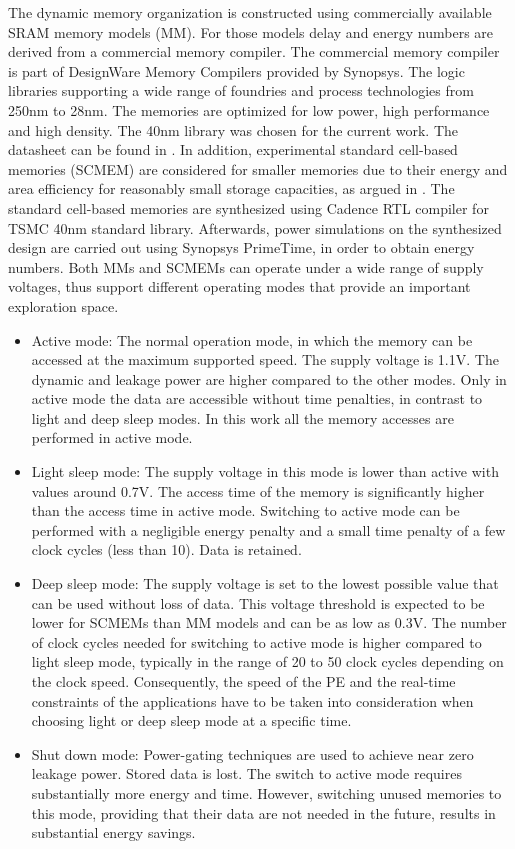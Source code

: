 \documentclass[prodmode,acmtecs]{acmsmall}
\begin{document}
The dynamic memory organization is constructed using commercially available SRAM memory models (MM).
For those models delay and energy numbers are derived from a commercial memory compiler.
The commercial memory compiler is part of DesignWare Memory Compilers provided by Synopsys. The logic libraries supporting a wide range of foundries and process technologies from 250nm to 28nm. The memories are optimized for low power, high performance and high density. The 40nm library was chosen for the current work. The datasheet can be found in \cite{Virage}.
In addition, experimental standard cell-based memories (SCMEM) \cite{Mei11}  are  considered for smaller memories due to their energy and area efficiency for reasonably small storage capacities, as argued in \cite{Mei10}. 
The standard cell-based memories are synthesized using Cadence RTL compiler for TSMC 40nm standard library. 
Afterwards, power simulations on the synthesized design are carried out using Synopsys PrimeTime, in order to obtain energy numbers.
Both MMs and SCMEMs can operate under a wide range of supply voltages, thus support different operating modes that provide an important exploration space.
\begin{itemize}
\item Active mode: The normal operation mode, in which the memory can be accessed at the maximum supported speed. The supply voltage is 1.1V. 
The dynamic and leakage power are higher compared to the other modes.
Only in active mode the data are accessible without time penalties, in contrast to light and deep sleep modes.
In this work all the memory accesses are performed in active mode. 
\item Light sleep mode: The supply voltage in this mode is lower than active with values around 0.7V. 
The access time of the memory is significantly higher than the access time in active mode. 
Switching to active mode can be performed with a negligible energy penalty and a small time penalty of a few clock cycles (less than 10). 
Data is retained.  
\item Deep sleep mode: The supply voltage is set to the lowest possible value that can be used without loss of data. 
This voltage threshold is expected to be lower for SCMEMs than MM models and can be as low as 0.3V. 
The number of clock cycles needed for switching to active mode is higher compared to light sleep mode, typically in the range of 20 to 50 clock cycles depending on the clock speed. 
Consequently, the speed of the PE and the real-time constraints of the applications have to be taken into consideration when choosing light or deep sleep mode at a specific time.  
\item Shut down mode: Power-gating techniques are used to achieve near zero leakage power. 
Stored data is lost. 
The switch to active mode requires substantially more energy and time. 
However, switching unused memories to this mode, providing that their data are not needed in the future, results in substantial energy savings.
\end{itemize}  
\end{document}
